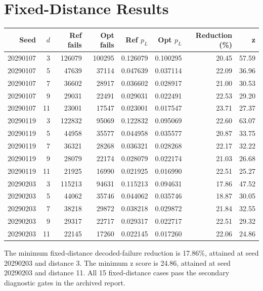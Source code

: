 \documentclass[11pt]{article}
\begin{document}
\section{Fixed-Distance Results}
\begin{center}
\scriptsize
\begin{tabular}{rrrrrrrr}
\toprule
Seed & $d$ & Ref fails & Opt fails & Ref $p_L$ & Opt $p_L$ & Reduction (\%) & z \\
\midrule
20290107 & 3 & 126079 & 100295 & 0.126079 & 0.100295 & 20.45 & 57.59 \\
20290107 & 5 & 47639 & 37114 & 0.047639 & 0.037114 & 22.09 & 36.96 \\
20290107 & 7 & 36602 & 28917 & 0.036602 & 0.028917 & 21.00 & 30.53 \\
20290107 & 9 & 29031 & 22491 & 0.029031 & 0.022491 & 22.53 & 29.20 \\
20290107 & 11 & 23001 & 17547 & 0.023001 & 0.017547 & 23.71 & 27.37 \\
20290119 & 3 & 122832 & 95069 & 0.122832 & 0.095069 & 22.60 & 63.07 \\
20290119 & 5 & 44958 & 35577 & 0.044958 & 0.035577 & 20.87 & 33.75 \\
20290119 & 7 & 36321 & 28268 & 0.036321 & 0.028268 & 22.17 & 32.22 \\
20290119 & 9 & 28079 & 22174 & 0.028079 & 0.022174 & 21.03 & 26.68 \\
20290119 & 11 & 21925 & 16990 & 0.021925 & 0.016990 & 22.51 & 25.27 \\
20290203 & 3 & 115213 & 94631 & 0.115213 & 0.094631 & 17.86 & 47.52 \\
20290203 & 5 & 44062 & 35746 & 0.044062 & 0.035746 & 18.87 & 30.05 \\
20290203 & 7 & 38218 & 29872 & 0.038218 & 0.029872 & 21.84 & 32.55 \\
20290203 & 9 & 29317 & 22717 & 0.029317 & 0.022717 & 22.51 & 29.32 \\
20290203 & 11 & 22145 & 17260 & 0.022145 & 0.017260 & 22.06 & 24.86 \\
\bottomrule
\end{tabular}
\end{center}

The minimum fixed-distance decoded-failure reduction is 17.86\%, attained at seed 20290203 and distance 3. The minimum z score is 24.86, attained at seed 20290203 and distance 11. All 15 fixed-distance cases pass the secondary diagnostic gates in the archived report.
\end{document}
